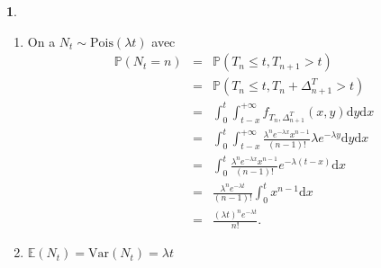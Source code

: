 \documentclass[8pt,notheorems]{beamer}
\def \E{\mathbb E}
\renewcommand{\Pr}{\mathbb{P}}
\theoremstyle{definition}
\theoremstyle{example}
\theoremstyle{mystyle}
\newtheorem{remark}{\translate{Remarque}}
\theoremstyle{plain}
\begin{document}
\begin{frame}[allowframebreaks]
\begin{remark}
\begin{enumerate}
  \item On a $N_t\sim\text{Pois}(\lambda t)$ avec
\begin{eqnarray*}
\Pr(N_t=n)&=&\Pr(T_n\leq t, T_{n+1}> t )\\
&=&\Pr(T_n\leq t, T_{n}+\Delta^T_{n+1}> t )\\
&=&\int_0^t\int_{t-x}^{+\infty}f_{T_n,\Delta^T_{n+1}}(x,y)\text{d}y\text{d}x\\
&=&\int_0^t\int_{t-x}^{+\infty}\frac{\lambda^{n}e^{-\lambda x}x^{n-1}}{(n-1)!}\lambda e^{-\lambda y}\text{d}y\text{d}x\\
&=&\int_0^t\frac{\lambda^{n}e^{-\lambda x}x^{n-1}}{(n-1)!} e^{-\lambda (t-x)}\text{d}x\\
&=&\frac{\lambda^{n}e^{-\lambda t}}{(n-1)!}\int_0^tx^{n-1}\text{d}x\\
&=&\frac{(\lambda t)^{n}e^{-\lambda t}}{n!}.
\end{eqnarray*}
\item $\E(N_t)=\text{Var}(N_t)=\lambda t$
\end{enumerate}


\end{remark}
\end{frame}
\end{document}
